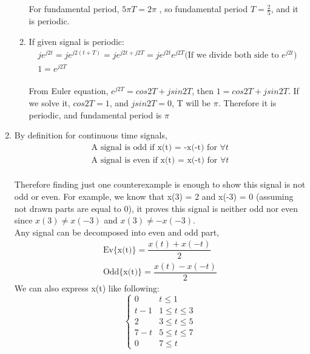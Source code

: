 \documentclass[10pt,a4paper, margin=1in]{article}
\begin{document}
\begin{enumerate}
\begin{enumerate}
\begin{gather*}
    \end{gather*} \\
    For fundamental period, $5\pi T=2\pi$ , so fundamental period $T=\frac{2}{5}$, and it is periodic.
    \item %
    If given signal is periodic:
    \begin{gather*}
        je^{j2t} = je^{j2(t+T)} = je^{j2t+j2T}=je^{j2t}e^{j2T} \text{(If we divide both side to $e^{j2t})$}\\
        1 =e^{j2T}
    \end{gather*} \\
    From Euler equation, $e^{j2T}=cos2T+jsin2T$, then $1=cos2T+jsin2T$. If we solve it, $cos2T=1$, and $jsin2T=0$, T will be $\pi$. Therefore it is periodic, and fundamental period is $\pi$
    \end{enumerate}

\item %
By definition for continuous time signals,\\
\begin{gather*}
    \text{A signal is odd if x(t) = -x(-t) for  }\forall t   \\
    \text{A signal is even if x(t) = x(-t) for   } \forall t
\end{gather*} \\
Therefore finding just one counterexample is enough to show this signal is not odd or even. For example, we know that x(3) = 2 and x(-3) = 0 (assuming not drawn parts are equal to 0), it proves this signal is neither odd nor even since $x(3) \neq x(-3)$ and $x(3) \neq -x(-3)$. \\
Any signal can be decomposed into even and odd part,\\
\begin{gather*}
    \text{Ev\{x(t)\}}=\dfrac{x(t)+x(-t)}{2} \\
    \text{Odd\{x(t)\}}=\dfrac{x(t)-x(-t)}{2}
\end{gather*}
We can also express x(t) like following: \\
\[ \begin{cases}
      0 & t\leq 1 \\
      t-1 & 1\leq t\leq 3 \\
      2 & 3\leq t \leq 5 \\
      7-t & 5\leq t \leq7 \\
      0 &  7 \leq t


\end{cases}\]
\end{enumerate}
\end{document}

